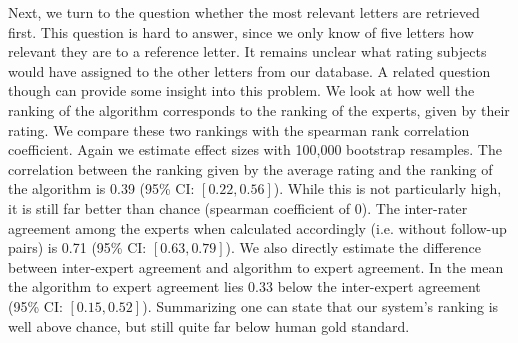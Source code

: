 Next, we turn to the question whether the most relevant letters are retrieved first. This question is hard to answer, since we only know of five letters how relevant they are to a reference letter. It remains unclear what rating subjects would have assigned to the other letters from our database. A related question though can provide some insight into this problem. We look at how well the ranking of the algorithm corresponds to the ranking of the experts, given by their rating. We compare these two rankings with the spearman rank correlation coefficient. Again we estimate effect sizes with 100,000 bootstrap resamples. The correlation between the ranking given by the average rating and the ranking of the algorithm is 0.39 (95\% CI: $[0.22, 0.56]$). While this is not particularly high, it is still far better than chance (spearman coefficient of 0). The inter-rater agreement among the experts when calculated accordingly (i.e. without follow-up pairs) is 0.71 (95\% CI: $[0.63, 0.79]$). We also directly estimate the difference between inter-expert agreement and algorithm to expert agreement. In the mean the algorithm to expert agreement lies 0.33 below the inter-expert agreement (95\% CI: $[0.15, 0.52]$). Summarizing one can state that our system's ranking is well above chance, but still quite far below human gold standard.





